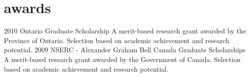 \section{awards}

\begin{entrylist}
\entry
{2010}
{Ontario Graduate Scholarship}
{}
{A merit-based research grant awarded by the Province of Ontario. Selection based on academic achievement and research potential. }
\entry
{2009}
{NSERC - Alexander Graham Bell Canada Graduate Scholarships}
{}
{A merit-based research grant awarded by the Government of Canada. Selection based on academic achievement and research potential.}

\end{entrylist}